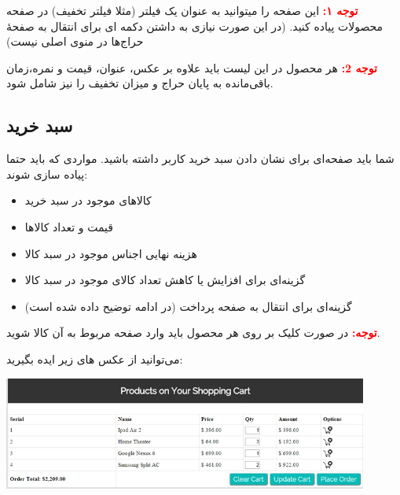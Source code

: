 \documentclass[]{article}
\begin{document}
\textbf{\textcolor{red}{توجه ۱:}}
این صفحه را میتوانید به عنوان یک فیلتر (مثلا فیلتر تخفیف) در صفحه محصولات پیاده کنید. (در این صورت نیازی به داشتن دکمه ای برای انتقال به صفحهٔ حراج‌ها در منوی اصلی نیست)


\textbf{\textcolor{red}{توجه 2:}}
هر محصول در این لیست باید علاوه بر عکس، عنوان، قیمت و نمره،زمان باقی‌مانده به پایان حراج و میزان تخفیف را نیز شامل شود.


\subsection*{{\titr سبد خرید}}

شما باید صفحه‌ای برای نشان دادن سبد خرید کاربر داشته باشید. مواردی که باید حتما پیاده سازی شوند:

\begin{itemize}
\item
کالا‌های موجود در سبد خرید

\item
قیمت و تعداد کالاها

\item
هزینه نهایی اجناس موجود در سبد کالا

\item
گزینه‌ای برای افزایش یا کاهش تعداد کالای موجود در سبد کالا

\item
گزینه‌ای برای انتقال به صفحه پرداخت (در ادامه توضیح داده شده است)


\end{itemize}

\textbf{\textcolor{red}{توجه:}}
 در صورت کلیک بر روی هر محصول باید وارد صفحه مربوط به آن کالا شوید.
 
 
می‌توانید از عکس های زیر ایده بگیرید:


\begin{center}
\includegraphics[width=0.9\textwidth]{images/image28.png}
\end{center}
\end{document}
